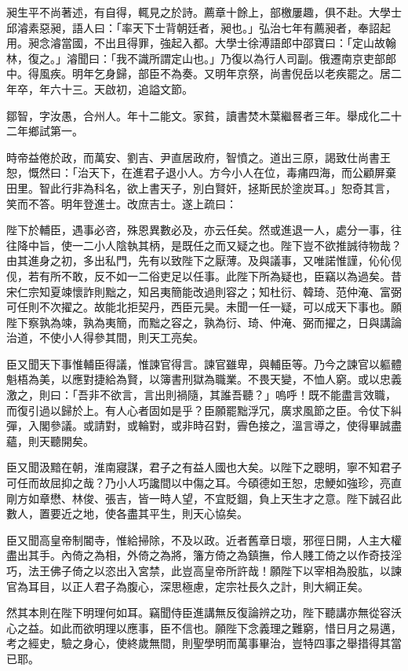 \begin{pinyinscope}
昶生平不尚著述，有自得，輒見之於詩。薦章十餘上，部檄屢趣，俱不赴。大學士邱濬素惡昶，語人曰：「率天下士背朝廷者，昶也。」弘治七年有薦昶者，奉詔起用。昶念濬當國，不出且得罪，強起入都。大學士徐溥語郎中邵寶曰：「定山故翰林，復之。」濬聞曰：「我不識所謂定山也。」乃復以為行人司副。俄遷南京吏部郎中。得風疾。明年乞身歸，部臣不為奏。又明年京祭，尚書倪岳以老疾罷之。居二年卒，年六十三。天啟初，追謚文節。

鄒智，字汝愚，合州人。年十二能文。家貧，讀書焚木葉繼晷者三年。舉成化二十二年鄉試第一。

時帝益倦於政，而萬安、劉吉、尹直居政府，智憤之。道出三原，謁致仕尚書王恕，慨然曰：「治天下，在進君子退小人。方今小人在位，毒痡四海，而公顧屏棄田里。智此行非為科名，欲上書天子，別白賢奸，拯斯民於塗炭耳。」恕奇其言，笑而不答。明年登進士。改庶吉士。遂上疏曰：

陛下於輔臣，遇事必咨，殊恩異數必及，亦云任矣。然或進退一人，處分一事，往往降中旨，使一二小人陰執其柄，是既任之而又疑之也。陛下豈不欲推誠待物哉？由其進身之初，多出私門，先有以致陛下之厭薄。及與議事，又唯諾惟謹，伈伈伣伣，若有所不敢，反不如一二俗吏足以任事。此陛下所為疑也，臣竊以為過矣。昔宋仁宗知夏竦懷詐則黜之，知呂夷簡能改過則容之；知杜衍、韓琦、范仲淹、富弼可任則不次擢之。故能北拒契丹，西臣元昊。未聞一任一疑，可以成天下事也。願陛下察孰為竦，孰為夷簡，而黜之容之，孰為衍、琦、仲淹、弼而擢之，日與講論治道，不使小人得參其間，則天工亮矣。

臣又聞天下事惟輔臣得議，惟諫官得言。諫官雖卑，與輔臣等。乃今之諫官以軀體魁梧為美，以應對捷給為賢，以簿書刑獄為職業。不畏天變，不恤人窮。或以忠義激之，則曰：「吾非不欲言，言出則禍隨，其誰吾聽？」嗚呼！既不能盡言效職，而復引過以歸於上。有人心者固如是乎？臣願罷黜浮冗，廣求風節之臣。令仗下糾彈，入閣參議。或請對，或輪對，或非時召對，霽色接之，溫言導之，使得畢誠盡蘊，則天聽開矣。

臣又聞汲黯在朝，淮南寢謀，君子之有益人國也大矣。以陛下之聰明，寧不知君子可任而故屈抑之哉？乃小人巧讒間以中傷之耳。今碩德如王恕，忠鯁如強珍，亮直剛方如章懋、林俊、張吉，皆一時人望，不宜貶錮，負上天生才之意。陛下誠召此數人，置要近之地，使各盡其平生，則天心協矣。

臣又聞高皇帝制閽寺，惟給掃除，不及以政。近者舊章日壞，邪徑日開，人主大權盡出其手。內倚之為相，外倚之為將，籓方倚之為鎮撫，伶人賤工倚之以作奇技淫巧，法王佛子倚之以恣出入宮禁，此豈高皇帝所許哉！願陛下以宰相為股肱，以諫官為耳目，以正人君子為腹心，深思極慮，定宗社長久之計，則大綱正矣。

然其本則在陛下明理何如耳。竊聞侍臣進講無反復論辨之功，陛下聽講亦無從容沃心之益。如此而欲明理以應事，臣不信也。願陛下念義理之難窮，惜日月之易邁，考之經史，驗之身心，使終歲無間，則聖學明而萬事畢治，豈特四事之舉措得其當已耶。


\end{pinyinscope}
